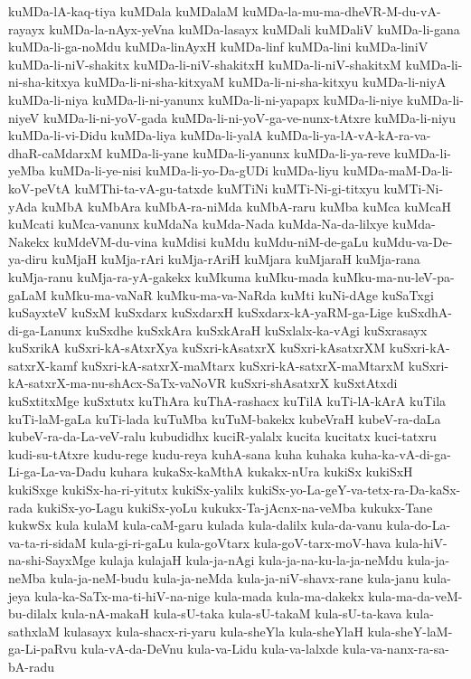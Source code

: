 {kuMDa-lA-kaq-tiya
kuMDala
kuMDalaM
kuMDa-la-mu-ma-dheVR-M-du-vA-rayayx
kuMDa-la-nAyx-yeVna
kuMDa-lasayx
kuMDali
kuMDaliV
kuMDa-li-gana
kuMDa-li-ga-noMdu
kuMDa-linAyxH
kuMDa-linf
kuMDa-lini
kuMDa-liniV
kuMDa-li-niV-shakitx
kuMDa-li-niV-shakitxH
kuMDa-li-niV-shakitxM
kuMDa-li-ni-sha-kitxya
kuMDa-li-ni-sha-kitxyaM
kuMDa-li-ni-sha-kitxyu
kuMDa-li-niyA
kuMDa-li-niya
kuMDa-li-ni-yanunx
kuMDa-li-ni-yapapx
kuMDa-li-niye
kuMDa-li-niyeV
kuMDa-li-ni-yoV-gada
kuMDa-li-ni-yoV-ga-ve-nunx-tAtxre
kuMDa-li-niyu
kuMDa-li-vi-Didu
kuMDa-liya
kuMDa-li-yalA
kuMDa-li-ya-lA-vA-kA-ra-va-dhaR-caMdarxM
kuMDa-li-yane
kuMDa-li-yanunx
kuMDa-li-ya-reve
kuMDa-li-yeMba
kuMDa-li-ye-nisi
kuMDa-li-yo-Da-gUDi
kuMDa-liyu
kuMDa-maM-Da-li-koV-peVtA
kuMThi-ta-vA-gu-tatxde
kuMTiNi
kuMTi-Ni-gi-titxyu
kuMTi-Ni-yAda
kuMbA
kuMbAra
kuMbA-ra-niMda
kuMbA-raru
kuMba
kuMca
kuMcaH
kuMcati
kuMca-vanunx
kuMdaNa
kuMda-Nada
kuMda-Na-da-lilxye
kuMda-Nakekx
kuMdeVM-du-vina
kuMdisi
kuMdu
kuMdu-niM-de-gaLu
kuMdu-va-De-ya-diru
kuMjaH
kuMja-rAri
kuMja-rAriH
kuMjara
kuMjaraH
kuMja-rana
kuMja-ranu
kuMja-ra-yA-gakekx
kuMkuma
kuMku-mada
kuMku-ma-nu-leV-pa-gaLaM
kuMku-ma-vaNaR
kuMku-ma-va-NaRda
kuMti
kuNi-dAge
kuSaTxgi
kuSayxteV
kuSxM
kuSxdarx
kuSxdarxH
kuSxdarx-kA-yaRM-ga-Lige
kuSxdhA-di-ga-Lanunx
kuSxdhe
kuSxkAra
kuSxkAraH
kuSxlalx-ka-vAgi
kuSxrasayx
kuSxrikA
kuSxri-kA-sAtxrXya
kuSxri-kAsatxrX
kuSxri-kAsatxrXM
kuSxri-kA-satxrX-kamf
kuSxri-kA-satxrX-maMtarx
kuSxri-kA-satxrX-maMtarxM
kuSxri-kA-satxrX-ma-nu-shAcx-SaTx-vaNoVR
kuSxri-shAsatxrX
kuSxtAtxdi
kuSxtitxMge
kuSxtutx
kuThAra
kuThA-rashacx
kuTilA
kuTi-lA-kArA
kuTila
kuTi-laM-gaLa
kuTi-lada
kuTuMba
kuTuM-bakekx
kubeVraH
kubeV-ra-daLa
kubeV-ra-da-La-veV-ralu
kubudidhx
kuciR-yalalx
kucita
kucitatx
kuci-tatxru
kudi-su-tAtxre
kudu-rege
kudu-reya
kuhA-sana
kuha
kuhaka
kuha-ka-vA-di-ga-Li-ga-La-va-Dadu
kuhara
kukaSx-kaMthA
kukakx-nUra
kukiSx
kukiSxH
kukiSxge
kukiSx-ha-ri-yitutx
kukiSx-yalilx
kukiSx-yo-La-geY-va-tetx-ra-Da-kaSx-rada
kukiSx-yo-Lagu
kukiSx-yoLu
kukukx-Ta-jAcnx-na-veMba
kukukx-Tane
kukwSx
kula
kulaM
kula-caM-garu
kulada
kula-dalilx
kula-da-vanu
kula-do-La-va-ta-ri-sidaM
kula-gi-ri-gaLu
kula-goVtarx
kula-goV-tarx-moV-hava
kula-hiV-na-shi-SayxMge
kulaja
kulajaH
kula-ja-nAgi
kula-ja-na-ku-la-ja-neMdu
kula-ja-neMba
kula-ja-neM-budu
kula-ja-neMda
kula-ja-niV-shavx-rane
kula-janu
kula-jeya
kula-ka-SaTx-ma-ti-hiV-na-nige
kula-mada
kula-ma-dakekx
kula-ma-da-veM-bu-dilalx
kula-nA-makaH
kula-sU-taka
kula-sU-takaM
kula-sU-ta-kava
kula-sathxlaM
kulasayx
kula-shacx-ri-yaru
kula-sheYla
kula-sheYlaH
kula-sheY-laM-ga-Li-paRvu
kula-vA-da-DeVnu
kula-va-Lidu
kula-va-lalxde
kula-va-nanx-ra-sa-bA-radu
}
